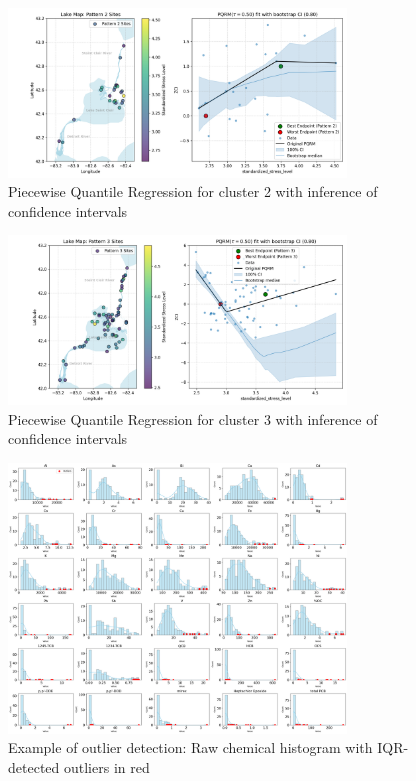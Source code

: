 \begin{figure}[!h]
    \centering
    \includegraphics[width=0.8\textwidth]{../results/preliminary_results/pqrm_pattern_2_tau_0.5.png}
    \caption{Piecewise Quantile Regression for cluster 2 with inference of confidence intervals}
    \label{fig:pqrm_pattern_2_tau_0.5}
\end{figure}

\begin{figure}[!h]
    \centering
    \includegraphics[width=0.8\textwidth]{../results/preliminary_results/pqrm_pattern_3_tau_0.5.png}
    \caption{Piecewise Quantile Regression for cluster 3 with inference of confidence intervals}
    \label{fig:pqrm_pattern_3_tau_0.5}
\end{figure}

\begin{figure}[!h]
    \centering
    \includegraphics[width=0.8\textwidth]{../results/preliminary_results/raw_chemical_histgram.png}
    \caption{Example of outlier detection: Raw chemical histogram with IQR-detected outliers in red}
    \label{fig:raw_chemical_histgram}
\end{figure}


